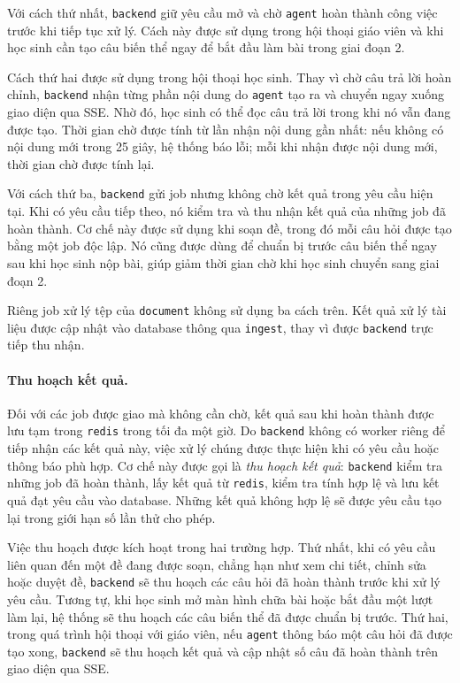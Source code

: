 Với cách thứ nhất, \texttt{backend} giữ yêu cầu mở và chờ \texttt{agent} hoàn thành công việc trước 
khi tiếp tục xử lý. Cách này được sử dụng trong hội thoại giáo viên và khi học sinh cần tạo câu biến 
thể ngay để bắt đầu làm bài trong giai đoạn 2.

Cách thứ hai được sử dụng trong hội thoại học sinh. Thay vì chờ câu trả lời hoàn chỉnh, \texttt{backend} 
nhận từng phần nội dung do \texttt{agent} tạo ra và chuyển ngay xuống giao diện qua SSE. Nhờ đó, học sinh 
có thể đọc câu trả lời trong khi nó vẫn đang được tạo. Thời gian chờ được tính từ lần nhận nội dung gần 
nhất: nếu không có nội dung mới trong 25 giây, hệ thống báo lỗi; mỗi khi nhận được nội dung mới, thời 
gian chờ được tính lại.

Với cách thứ ba, \texttt{backend} gửi job nhưng không chờ kết quả trong yêu cầu hiện tại. Khi có yêu 
cầu tiếp theo, nó kiểm tra và thu nhận kết quả của những job đã hoàn thành. Cơ chế này được sử dụng khi 
soạn đề, trong đó mỗi câu hỏi được tạo bằng một job độc lập. Nó cũng được dùng để chuẩn bị trước câu 
biến thể ngay sau khi học sinh nộp bài, giúp giảm thời gian chờ khi học sinh chuyển sang giai đoạn 2.

Riêng job xử lý tệp của \texttt{document} không sử dụng ba cách trên. Kết quả xử lý tài liệu được 
cập nhật vào database thông qua \texttt{ingest}, thay vì được \texttt{backend} trực tiếp thu nhận.

\paragraph{Thu hoạch kết quả.}
Đối với các job được giao mà không cần chờ, kết quả sau khi hoàn thành được lưu tạm trong 
\texttt{redis} trong tối đa một giờ. Do \texttt{backend} không có worker riêng để tiếp nhận 
các kết quả này, việc xử lý chúng được thực hiện khi có yêu cầu hoặc thông báo phù hợp. 
Cơ chế này được gọi là \emph{thu hoạch kết quả}: \texttt{backend} kiểm tra những job đã hoàn thành, 
lấy kết quả từ \texttt{redis}, kiểm tra tính hợp lệ và lưu kết quả đạt yêu cầu vào database. 
Những kết quả không hợp lệ sẽ được yêu cầu tạo lại trong giới hạn số lần thử cho phép.

Việc thu hoạch được kích hoạt trong hai trường hợp. Thứ nhất, khi có yêu cầu liên quan 
đến một đề đang được soạn, chẳng hạn như xem chi tiết, chỉnh sửa hoặc duyệt đề, \texttt{backend} 
sẽ thu hoạch các câu hỏi đã hoàn thành trước khi xử lý yêu cầu. Tương tự, khi học sinh mở màn 
hình chữa bài hoặc bắt đầu một lượt làm lại, hệ thống sẽ thu hoạch các câu biến thể đã được 
chuẩn bị trước. Thứ hai, trong quá trình hội thoại với giáo viên, nếu \texttt{agent} thông báo 
một câu hỏi đã được tạo xong, \texttt{backend} sẽ thu hoạch kết quả và cập nhật số câu đã hoàn 
thành trên giao diện qua SSE.

